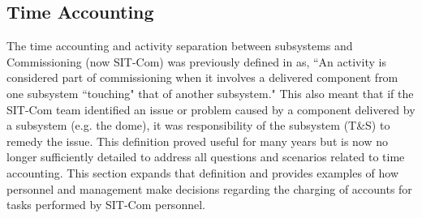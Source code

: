 \documentclass[SE,lsstdraft,authoryear,toc]{lsstdoc, lsstdraft}
\begin{document}
%
%


\subsection{Time Accounting}
\label{sec:time}

The time accounting and activity separation between subsystems and Commissioning (now SIT-Com) was previously defined in  as, ``An activity is considered part of commissioning when it involves a delivered component from one subsystem ``touching" that of another subsystem."
This also meant that if the SIT-Com team identified an issue or problem caused by a component delivered by a subsystem (e.g. the dome), it was responsibility of the subsystem (T\&S) to remedy the issue.
This definition proved useful for many years but is now no longer sufficiently detailed to address all questions and scenarios related to time accounting.
This section expands that definition and provides examples of how personnel and management make decisions regarding the charging of accounts for tasks performed by SIT-Com personnel.
\end{document}
